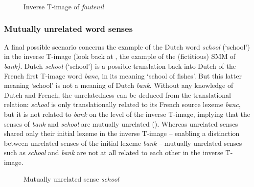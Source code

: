 \begin{figure}
\caption{\label{fig:3:13}Inverse T-image of \textit{fauteuil}}
\end{figure}

\subsubsection{Mutually unrelated word senses}
\label{sec:3.4.3.3}
A final possible scenario concerns the example of the Dutch word \textit{school} (`school') in the inverse T-image (look back at , the example of the (fictitious) SMM of \textit{bank).} Dutch \textit{school} (`school') is a possible translation back into Dutch of the French first T-image word \textit{banc}, in its meaning `school of fishes'. But this latter meaning `school' is not a meaning of Dutch \textit{bank}. Without any knowledge of Dutch and French, the unrelatedness can be deduced from the translational relation: \textit{school} is only translationally related to its French source lexeme \textit{banc}, but it is not related to \textit{bank} on the level of the inverse T-image, implying that the senses of \textit{bank} and \textit{school} are mutually unrelated (). Whereas unrelated senses shared only their initial lexeme in the inverse T-image -- enabling a distinction between unrelated senses of the initial lexeme \textit{bank} -- mutually unrelated senses such as \textit{school} and \textit{bank} are not at all related to each other in the inverse T-image.

\begin{figure}
\caption{\label{fig:3:14}  Mutually unrelated sense \textit{school}}
\end{figure}

